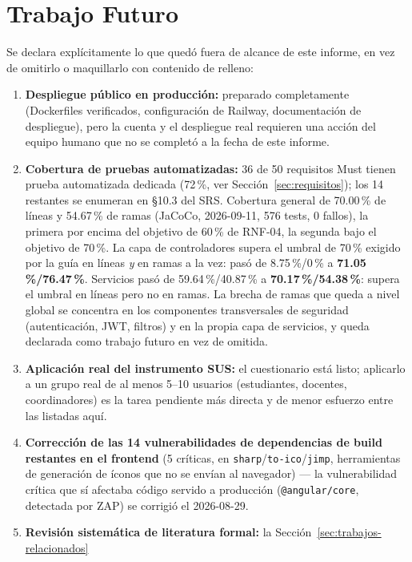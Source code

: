 \section{Trabajo Futuro}
\label{sec:trabajo-futuro}

Se declara explícitamente lo que quedó fuera de alcance de este informe, en vez de omitirlo o
maquillarlo con contenido de relleno:

\begin{enumerate}[nosep]
    \item \textbf{Despliegue público en producción:} preparado completamente (Dockerfiles verificados,
    configuración de Railway, documentación de despliegue), pero la cuenta y el despliegue real requieren
    una acción del equipo humano que no se completó a la fecha de este informe.
    \item \textbf{Cobertura de pruebas automatizadas:} 36 de 50 requisitos Must tienen prueba automatizada
    dedicada (72\,\%, ver Sección~\ref{sec:requisitos}); los 14 restantes se enumeran en \S10.3 del SRS.
    Cobertura general de 70.00\,\% de líneas y 54.67\,\% de ramas (JaCoCo, 2026-09-11, 576 tests, 0
    fallos), la primera por encima del objetivo de 60\,\% de RNF-04, la segunda bajo el objetivo de
    70\,\%. La capa de controladores supera el umbral de 70\,\% exigido por la guía en líneas \emph{y} en
    ramas a la vez: pasó de 8.75\,\%/0\,\% a \textbf{71.05\,\%/76.47\,\%}. Servicios pasó de
    59.64\,\%/40.87\,\% a
    \textbf{70.17\,\%/54.38\,\%}: supera el umbral en líneas pero no en ramas. La brecha de ramas que
    queda a nivel global se concentra en los componentes transversales de seguridad (autenticación, JWT,
    filtros) y en la propia capa de servicios, y queda declarada como trabajo futuro en vez de omitida.
    \item \textbf{Aplicación real del instrumento SUS:} el cuestionario está listo; aplicarlo a un grupo
    real de al menos 5--10 usuarios (estudiantes, docentes, coordinadores) es la tarea pendiente más
    directa y de menor esfuerzo entre las listadas aquí.
    \item \textbf{Corrección de las 14 vulnerabilidades de dependencias de build restantes en el
    frontend} (5 críticas, en \texttt{sharp}/\texttt{to-ico}/\texttt{jimp}, herramientas de generación
    de íconos que no se envían al navegador) --- la vulnerabilidad crítica que sí afectaba código
    servido a producción (\texttt{@angular/core}, detectada por ZAP) se corrigió el 2026-08-29.
    \item \textbf{Revisión sistemática de literatura formal:} la Sección~\ref{sec:trabajos-relacionados}

\end{enumerate}
